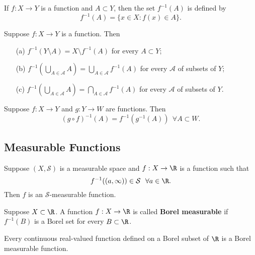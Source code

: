 \begin{definition}
   If \( f: X \to Y  \) is a function and \( A \subset Y  \), then the set \( f^{-1}(A) \) is defined by 
   \[  f^{-1}(A) = \{  x \in X : f(x) \in A  \}. \]
\end{definition}

\begin{prop}
    Suppose \( f: X \to Y  \) is a function. Then
    \begin{enumerate}
        \item[(a)] \(  f^{-1}(Y \setminus  A ) = X \setminus  f^{-1}(A) \) for every \( A \subset Y  \);
        \item[(b)] \( f^{-1}(\bigcup_{ A \in \mathcal{A} }^{  } A ) = \bigcup_{ A \in \mathcal{A} }^{  } f^{-1}(A)   \) for every \( \mathcal{A}  \) of subsets of \( Y  \);
        \item[(c)] \( f^{-1} (\bigcup_{A \in \mathcal{A} }^{  }  A ) = \bigcap_{  A \in \mathcal{A} }^{  }  f^{-1}(A) \) for every \( \mathcal{A}  \) of subsets of \( Y  \).
    \end{enumerate}
\end{prop} 

\begin{prop}
    Suppose \( f: X \to Y  \) and \( g : Y \to W  \) are functions. Then 
    \[  (g \circ f)^{-1}(A) =  f^{-1}(g^{-1}(A))  \ \ \forall A \subset W. \]
\end{prop}

\subsection{Measurable Functions}

\begin{prop}
    Suppose \( (X,\mathcal{S}) \) is a measurable space and \( f: X \to \R  \) is a function such that 
    \[  f^{-1}((a,\infty )) \in \mathcal{S} \ \ \forall a \in \R.  \]
    Then \( f  \) is an \( \mathcal{S} \)-measurable function.
\end{prop}

\begin{definition}
    Suppose \( X \subset \R  \). A function \( f: X \to \R  \) is called \textbf{Borel measurable} if \( f^{-1}(B) \) is a Borel set for every \( B \subset \R \). 
\end{definition}

\begin{prop}
    Every continuous real-valued function defined on a Borel subset of \( \R  \) is a Borel measurable function.
\end{prop}

